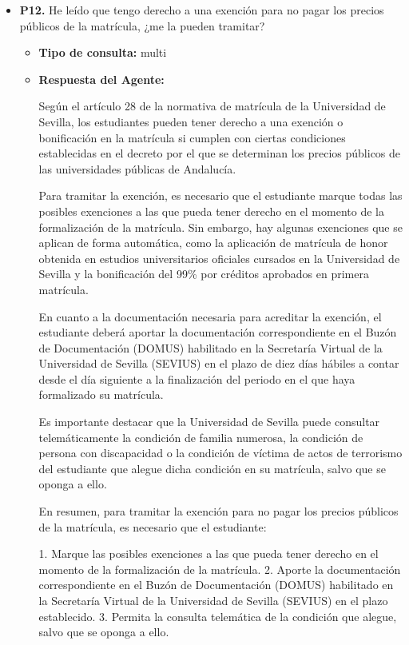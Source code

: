 \documentclass{article}
\begin{document}
\begin{itemize}
\begin{itemize}
\begin{scriptsize}
                  Revisión 3 (diciembre, 2024) 31
                \end{scriptsize}
        \end{itemize}


  \item \textbf{P12.} He leído que tengo derecho a una exención para no pagar los precios públicos de la matrícula, ¿me la pueden tramitar? \\
        \begin{itemize}
          \item \textbf{Tipo de consulta:} multi
          \item \textbf{Respuesta del Agente:}

                Según el artículo 28 de la normativa de matrícula de la Universidad de Sevilla, los estudiantes pueden tener derecho a una exención o bonificación en la matrícula si cumplen con ciertas condiciones establecidas en el decreto por el que se determinan los precios públicos de las universidades públicas de Andalucía.

                Para tramitar la exención, es necesario que el estudiante marque todas las posibles exenciones a las que pueda tener derecho en el momento de la formalización de la matrícula. Sin embargo, hay algunas exenciones que se aplican de forma automática, como la aplicación de matrícula de honor obtenida en estudios universitarios oficiales cursados en la Universidad de Sevilla y la bonificación del 99\% por créditos aprobados en primera matrícula.

                En cuanto a la documentación necesaria para acreditar la exención, el estudiante deberá aportar la documentación correspondiente en el Buzón de Documentación (DOMUS) habilitado en la Secretaría Virtual de la Universidad de Sevilla (SEVIUS) en el plazo de diez días hábiles a contar desde el día siguiente a la finalización del periodo en el que haya formalizado su matrícula.

                Es importante destacar que la Universidad de Sevilla puede consultar telemáticamente la condición de familia numerosa, la condición de persona con discapacidad o la condición de víctima de actos de terrorismo del estudiante que alegue dicha condición en su matrícula, salvo que se oponga a ello.

                En resumen, para tramitar la exención para no pagar los precios públicos de la matrícula, es necesario que el estudiante:

                1. Marque las posibles exenciones a las que pueda tener derecho en el momento de la formalización de la matrícula.
                2. Aporte la documentación correspondiente en el Buzón de Documentación (DOMUS) habilitado en la Secretaría Virtual de la Universidad de Sevilla (SEVIUS) en el plazo establecido.
                3. Permita la consulta telemática de la condición que alegue, salvo que se oponga a ello.


\end{itemize}
\end{itemize}
\end{document}
